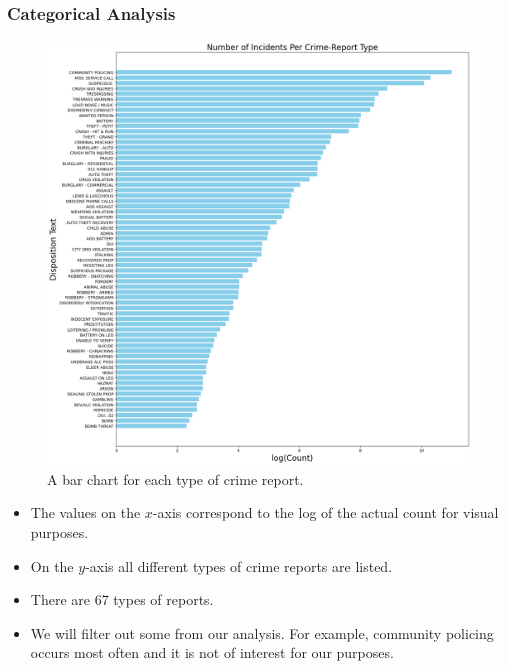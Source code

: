\documentclass{beamer}
\begin{document}
\begin{frame}
    \frametitle{Categorical Analysis}
    \begin{minipage}[c]{0.65\textwidth}
        \begin{figure}
            \centering
            \includegraphics[width=\linewidth]{Figures/Number of Incidents Per Crime-Report Type.png}
            \caption{A bar chart for each type of crime report.}
        \end{figure}
    \end{minipage}\hfill
    \begin{minipage}[c]{0.3\textwidth}
        {\scriptsize %
        \begin{itemize}
            \item The values on the $x$-axis correspond to the log of the actual count for visual purposes.
            \item On the $y$-axis all different types of crime reports are listed.
            \item There are 67 types of reports.
            \item We will filter out some from our analysis. For example, community policing occurs most often and it is not of interest for our purposes.
        \end{itemize}
        }
    \end{minipage}
\end{frame}
\end{document}
